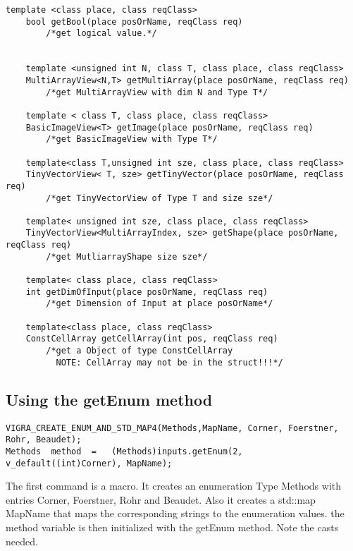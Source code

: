 \documentclass[a4paper,10pt]{article}
\begin{document}
\begin{lstlisting}[caption={matlab::InputArray}]
	template <class place, class reqClass>
	bool getBool(place posOrName, reqClass req)
		/*get logical value.*/


	template <unsigned int N, class T, class place, class reqClass>
	MultiArrayView<N,T> getMultiArray(place posOrName, reqClass req)
		/*get MultiArrayView with dim N and Type T*/
	
	template < class T, class place, class reqClass>
	BasicImageView<T> getImage(place posOrName, reqClass req)
		/*get BasicImageView with Type T*/

	template<class T,unsigned int sze, class place, class reqClass>
	TinyVectorView< T, sze> getTinyVector(place posOrName, reqClass req)
		/*get TinyVectorView of Type T and size sze*/

	template< unsigned int sze, class place, class reqClass>
	TinyVectorView<MultiArrayIndex, sze> getShape(place posOrName, reqClass req)
		/*get MutliarrayShape size sze*/

	template< class place, class reqClass>
	int getDimOfInput(place posOrName, reqClass req)
		/*get Dimension of Input at place posOrName*/

	template<class place, class reqClass>
	ConstCellArray getCellArray(int pos, reqClass req)
		/*get a Object of type ConstCellArray
		  NOTE: CellArray may not be in the struct!!!*/
\end{lstlisting}

\subsection{Using the getEnum method}
\begin{lstlisting}
VIGRA_CREATE_ENUM_AND_STD_MAP4(Methods,MapName, Corner, Foerstner, Rohr, Beaudet);
Methods  method  =   (Methods)inputs.getEnum(2,  v_default((int)Corner), MapName);
\end{lstlisting}
The first command is a macro. It creates an enumeration Type Methods with entries
Corner, Foerstner, Rohr and Beaudet. Also it creates a std::map MapName that maps the 
corresponding strings to the enumeration values.
the method variable is then initialized with the getEnum method. 
Note the casts needed. 
\end{document}
